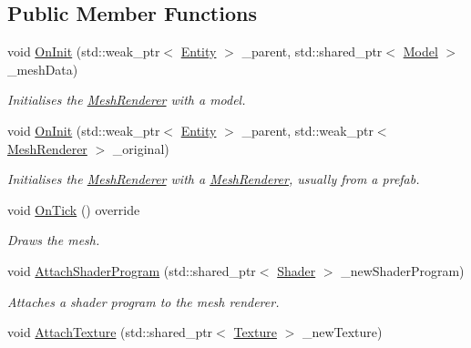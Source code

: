 \subsection*{Public Member Functions}
\begin{DoxyCompactItemize}
\item 
void \hyperlink{classfrontier_1_1_mesh_renderer_a3137cee27f2c38b49d31b7e944f8755c}{On\+Init} (std\+::weak\+\_\+ptr$<$ \hyperlink{classfrontier_1_1_entity}{Entity} $>$ \+\_\+parent, std\+::shared\+\_\+ptr$<$ \hyperlink{classfrontier_1_1_model}{Model} $>$ \+\_\+mesh\+Data)
\begin{DoxyCompactList}\small\item\em Initialises the \hyperlink{classfrontier_1_1_mesh_renderer}{Mesh\+Renderer} with a model. \end{DoxyCompactList}\item 
void \hyperlink{classfrontier_1_1_mesh_renderer_a27e5a0fdf24ffdae6555f2d132adf3f4}{On\+Init} (std\+::weak\+\_\+ptr$<$ \hyperlink{classfrontier_1_1_entity}{Entity} $>$ \+\_\+parent, std\+::weak\+\_\+ptr$<$ \hyperlink{classfrontier_1_1_mesh_renderer}{Mesh\+Renderer} $>$ \+\_\+original)
\begin{DoxyCompactList}\small\item\em Initialises the \hyperlink{classfrontier_1_1_mesh_renderer}{Mesh\+Renderer} with a \hyperlink{classfrontier_1_1_mesh_renderer}{Mesh\+Renderer}, usually from a prefab. \end{DoxyCompactList}\item 
void \hyperlink{classfrontier_1_1_mesh_renderer_acffde7174ddb009751e360df5d346922}{On\+Tick} () override
\begin{DoxyCompactList}\small\item\em Draws the mesh. \end{DoxyCompactList}\item 
void \hyperlink{classfrontier_1_1_mesh_renderer_a8be0a3e04dc5c9e56e230c914e58c2dc}{Attach\+Shader\+Program} (std\+::shared\+\_\+ptr$<$ \hyperlink{classfrontier_1_1_shader}{Shader} $>$ \+\_\+new\+Shader\+Program)
\begin{DoxyCompactList}\small\item\em Attaches a shader program to the mesh renderer. \end{DoxyCompactList}\item 
void \hyperlink{classfrontier_1_1_mesh_renderer_a5c915d5fba6a56841afe98123e8cfa5d}{Attach\+Texture} (std\+::shared\+\_\+ptr$<$ \hyperlink{classfrontier_1_1_texture}{Texture} $>$ \+\_\+new\+Texture)

\end{DoxyCompactItemize}

